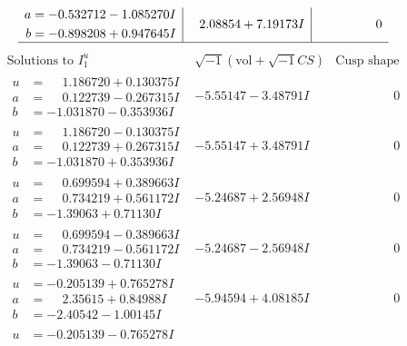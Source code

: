 \documentclass[1p]{elsarticle_modified}
\theoremstyle{definition}
\newcommand{\I}{\sqrt{-1}}
\begin{document}
$$\begin{array}{c|c|c}
\begin{aligned}
a &= -0.532712 - 1.085270 I \\
b &= -0.898208 + 0.947645 I\end{aligned}
 & \phantom{-}2.08854 + 7.19173 I & \phantom{-0.000000 } 0\\
 \hline 
 \end{array}$$\newpage$$\begin{array}{c|c|c}  
\text{Solutions to }I^u_{1}& \I (\text{vol} + \sqrt{-1}CS) & \text{Cusp shape}\\
 \hline 
\begin{aligned}
u &= \phantom{-}1.186720 + 0.130375 I \\
a &= \phantom{-}0.122739 - 0.267315 I \\
b &= -1.031870 - 0.353936 I\end{aligned}
 & -5.55147 - 3.48791 I & \phantom{-0.000000 } 0 \\ \hline\begin{aligned}
u &= \phantom{-}1.186720 - 0.130375 I \\
a &= \phantom{-}0.122739 + 0.267315 I \\
b &= -1.031870 + 0.353936 I\end{aligned}
 & -5.55147 + 3.48791 I & \phantom{-0.000000 } 0 \\ \hline\begin{aligned}
u &= \phantom{-}0.699594 + 0.389663 I \\
a &= \phantom{-}0.734219 + 0.561172 I \\
b &= -1.39063 + 0.71130 I\end{aligned}
 & -5.24687 + 2.56948 I & \phantom{-0.000000 } 0 \\ \hline\begin{aligned}
u &= \phantom{-}0.699594 - 0.389663 I \\
a &= \phantom{-}0.734219 - 0.561172 I \\
b &= -1.39063 - 0.71130 I\end{aligned}
 & -5.24687 - 2.56948 I & \phantom{-0.000000 } 0 \\ \hline\begin{aligned}
u &= -0.205139 + 0.765278 I \\
a &= \phantom{-}2.35615 + 0.84988 I \\
b &= -2.40542 - 1.00145 I\end{aligned}
 & -5.94594 + 4.08185 I & \phantom{-0.000000 } 0 \\ \hline\begin{aligned}
u &= -0.205139 - 0.765278 I \\

\end{aligned}
\end{array}$$
\end{document}
